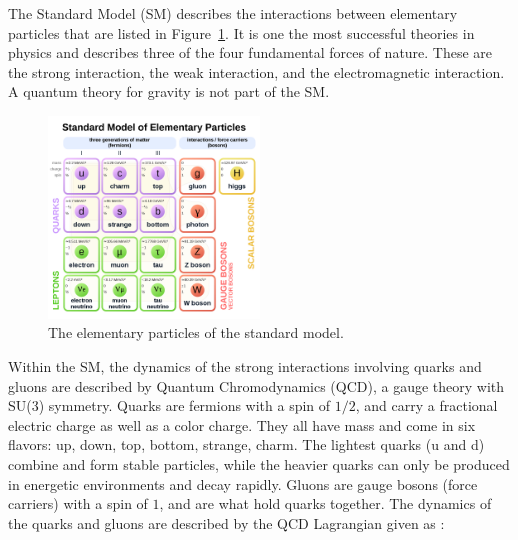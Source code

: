 The Standard Model (SM) \cite{Gaillard:1998ui} describes the interactions between elementary particles that are listed in Figure~\ref{fig:sm_particles}. It is one the most successful theories in physics and describes three of the four fundamental forces of nature. These are the strong interaction, the weak interaction, and the electromagnetic interaction. A quantum theory for gravity is not part of the SM.

\begin{figure}[htbp]
\begin{center}
\includegraphics[width=0.5\textwidth]{figures/theory/SM}
\caption{The elementary particles of the standard model.}
\label{fig:sm_particles}
\end{center}
\end{figure}



Within the SM, the dynamics of the strong interactions involving quarks and gluons are described by Quantum Chromodynamics (QCD), a gauge theory with SU(3) symmetry. Quarks are fermions with a spin of $1/2$, and carry a fractional electric charge as well as a color charge. They all have mass and come in six flavors: up, down, top, bottom, strange, charm. The lightest quarks (u and d) combine and form stable particles, while the heavier quarks can only be produced in energetic environments and decay rapidly. Gluons are gauge bosons (force carriers) with a spin of $1$, and are what hold quarks together. The dynamics of the quarks and gluons are described by the QCD Lagrangian given as \cite{Beringer:1481544}:

